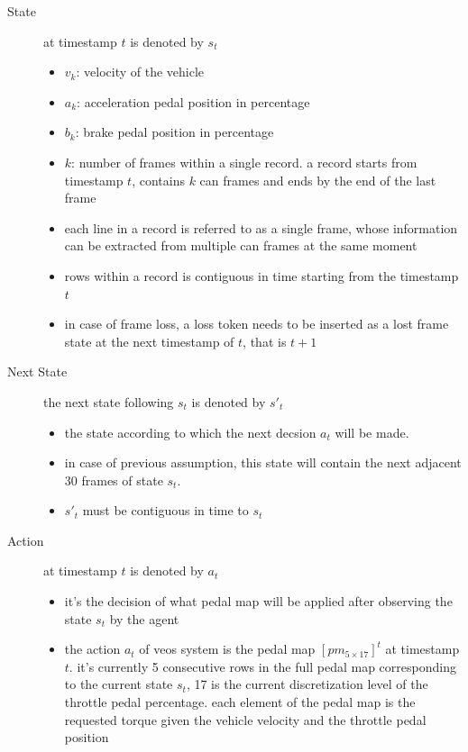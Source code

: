 \documentclass{article}
\begin{document}
\begin{figure}
\begin{minipage}[b]{0.45\linewidth}
	\end{minipage}
\end{figure}

\begin{description}
	\item[State] at timestamp $t$ is denoted by $s_t$
	      \begin{itemize}
		      \item $v_k$: velocity of the vehicle
		      \item $a_k$: acceleration pedal position in percentage
		      \item $b_k$: brake pedal position in percentage
		      \item $k$: number of frames within a single record. a record starts from timestamp $t$, contains $k$ can frames and ends by the end of the last frame
		      \item each line in a record is referred to as a single frame, whose information can be extracted from multiple can frames at the same moment
		      \item rows within a record is contiguous in time starting from the timestamp $t$
		      \item in case of frame loss, a loss token needs to be inserted as a lost frame state at the next timestamp of $t$, that is $t+1$
	      \end{itemize}
	\item[Next State] the next state following $s_t$ is denoted by $s'_t$
	      \begin{itemize}
		      \item the state according to which the next decsion $a_t$ will be made.
		      \item in case of previous assumption, this state will contain the next adjacent 30 frames of state $s_t$.
		      \item $s'_t$ must be contiguous in time to $s_t$
	      \end{itemize}
	\item[Action] at timestamp $t$ is denoted by $a_t$
	      \begin{itemize}
		      \item it's the decision of what pedal map will be applied after observing the state $s_t$ by the agent
		      \item the action $a_t$ of veos system is the pedal map $[pm_{5\times17}]^t$ at timestamp $t$. it's currently 5 consecutive rows in the full pedal map corresponding to the current state $s_t$, 17 is the current discretization level of the throttle pedal percentage. each element of the pedal map is the requested torque given the vehicle velocity and the throttle pedal position

\end{itemize}
\end{description}
\end{document}
